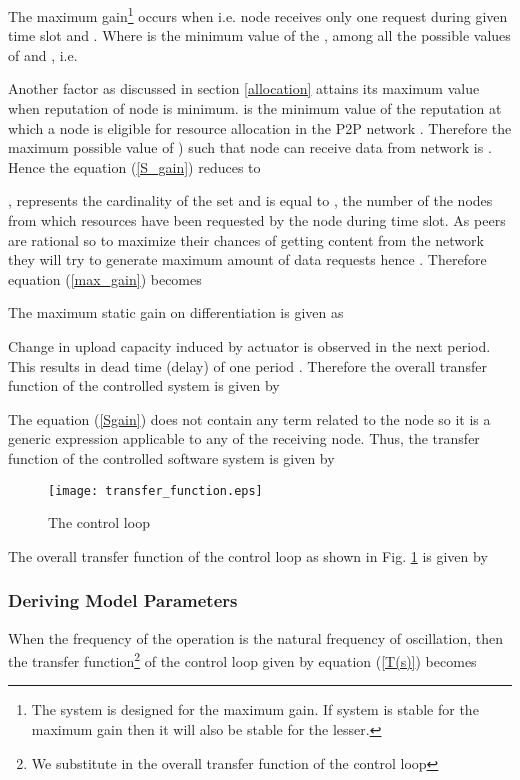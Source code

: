 \documentclass[journal]{IEEEtran}
\begin{document}
The maximum gain\footnote{The system is designed for the maximum gain. If system is stable for the maximum gain then it will also be stable for the lesser.}  occurs when  i.e. node  receives only one request during given time slot and  . Where  is the minimum value of the , among all the possible values of  and , i.e. 


Another factor  as discussed in section \ref{allocation} attains its maximum value when reputation of node is minimum.  is the minimum value of the reputation at which a node is eligible for resource allocation in the P2P network .
Therefore the maximum possible value of ) such that node can receive data from network is .  Hence the equation (\ref{S_gain}) reduces to

, represents the cardinality of the set  and is equal to , the number of the nodes from which resources have been requested by the node  during  time slot. As peers are rational so to maximize their chances of getting content from the network they will try to generate maximum amount of data requests hence  . Therefore equation (\ref{max_gain}) becomes


The maximum static gain  on differentiation is given as

Change in upload capacity induced by actuator is observed in the next period. This results in  dead time (delay) of one period .  Therefore the overall transfer function of the controlled system is given by

The equation (\ref{Sgain}) does not contain any term related to the node  so it is a generic expression applicable to any of the receiving node. Thus, the transfer function of the controlled software system is given by

\begin{figure}
	\centering
	\texttt{[image: transfer\_function.eps]}
	\caption{The control loop }
	\label{Transfer_Function}
\end{figure}  

The overall transfer function of the control loop as shown in Fig. \ref{Transfer_Function} is given by 
 
\subsubsection{Deriving Model Parameters} 
When the frequency of the operation is the natural frequency of oscillation, then the transfer function\footnote{We substitute  in the overall transfer function of the control loop } of the control loop given by equation (\ref{T(s)}) becomes
\end{document}
